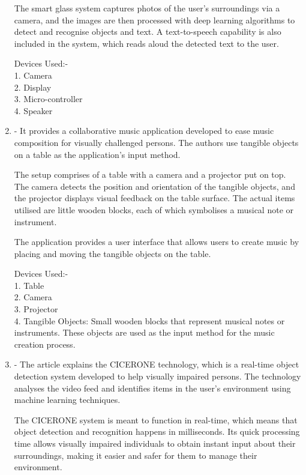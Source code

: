 \documentclass[MScCS]{uccthesis}
\begin{document}
\begin{enumerate}
The smart glass system captures photos of the user's surroundings via a camera, and the images are then processed with deep learning algorithms to detect and recognise objects and text. A text-to-speech capability is also included in the system, which reads aloud the detected text to the user.

Devices Used:-\\
1. Camera\\
2. Display\\
3. Micro-controller\\
4. Speaker\\


\item \textbf{\Parencite{collaborative}}- It provides a collaborative music application developed to ease music composition for visually challenged persons. The authors use tangible objects on a table as the application's input method.

The setup comprises of a table with a camera and a projector put on top. The camera detects the position and orientation of the tangible objects, and the projector displays visual feedback on the table surface. The actual items utilised are little wooden blocks, each of which symbolises a musical note or instrument.

The application provides a user interface that allows users to create music by placing and moving the tangible objects on the table.

Devices Used:-\\
1. Table\\
2. Camera\\
3. Projector\\
4. Tangible Objects: Small wooden blocks that represent musical notes or instruments. These objects are used as the input method for the music creation process.

\item \textbf{\Parencite{cicerone}}- The article explains the CICERONE technology, which is a real-time object detection system developed to help visually impaired persons.
The technology analyses the video feed and identifies items in the user's environment using machine learning techniques.

The CICERONE system is meant to function in real-time, which means that object detection and recognition happens in milliseconds. Its quick processing time allows visually impaired individuals to obtain instant input about their surroundings, making it easier and safer for them to manage their environment.


\end{enumerate}
\end{document}
